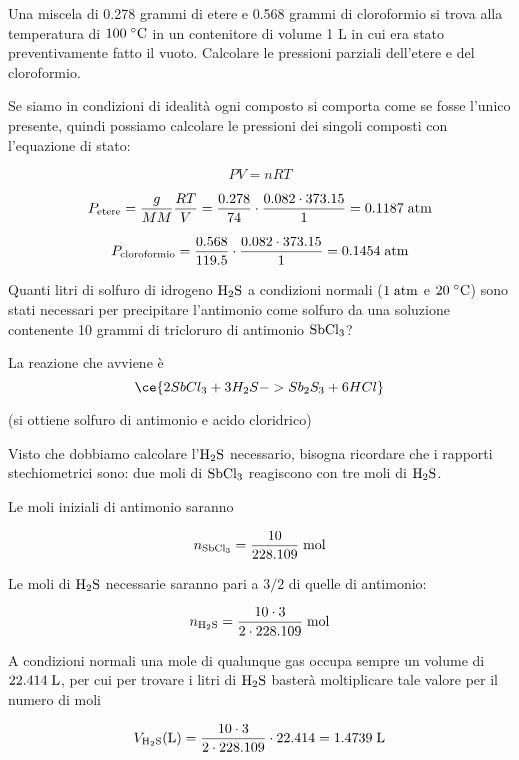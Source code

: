 \begin{esercizio}[$\bigstar$]
    Una miscela di 0.278 grammi di etere e 0.568 grammi di cloroformio si trova alla temperatura di $100 \; \rm ^{\circ}C$ in un contenitore di volume 1 L in cui era stato preventivamente fatto il vuoto. Calcolare le pressioni parziali dell'etere e del cloroformio.
\end{esercizio}
\begin{soluzione}
    Se siamo in condizioni di idealità ogni composto si comporta come se fosse l'unico presente, quindi possiamo calcolare le pressioni dei singoli composti con l'equazione di stato:

$$PV=nRT$$

$$P_{\rm etere}
=\frac{g}{MM}\frac{RT}{V}
=\frac{0.278}{74}\cdot\frac{0.082 \cdot 373.15}{1}
=0.1187 \; \rm atm$$

$$P_{\rm cloroformio}
=\frac{0.568}{119.5}\cdot\frac{0.082 \cdot 373.15}{1}
=0.1454 \; \rm atm$$

\end{soluzione}

\newpage

\begin{esercizio}[$\bigstar$]
    Quanti litri di solfuro di idrogeno $\rm H_2S$ a condizioni normali ($1 \; \rm atm$ e $20 \; ^{\circ}\rm C$) sono stati necessari per precipitare l'antimonio come solfuro da una soluzione contenente 10 grammi di tricloruro di antimonio $\rm SbCl_3$?
\end{esercizio}
\begin{soluzione}
    La reazione che avviene è
    \begin{equation*}
        \ce{2SbCl_3 + 3H_2S -> Sb_2S_3 + 6HCl}
    \end{equation*}

(si ottiene solfuro di antimonio e acido cloridrico)

Visto che dobbiamo calcolare l'$\rm H_2S$ necessario, bisogna ricordare che i rapporti stechiometrici sono: due moli di $\rm SbCl_3$ reagiscono con tre moli di $\rm H_2S$.

Le moli iniziali di antimonio saranno

$$n_{\rm SbCl_3}=\frac{10}{228.109} \; \rm mol$$

Le moli di $\rm H_2S$ necessarie saranno pari a $3/2$ di quelle di antimonio:

$$n_{\rm H_2S}=\frac{10 \cdot 3}{2 \cdot 228.109} \; \rm mol$$

A condizioni normali una mole di qualunque gas occupa sempre un volume di $22.414 \; \rm L$, per cui per trovare i litri di $\rm H_2S$ basterà moltiplicare tale valore per il numero di moli

$$V_{\rm H_2S}(\text{L})
=\frac{10 \cdot 3}{2 \cdot 228.109} \cdot 22.414
=1.4739 \; \rm L$$

\end{soluzione}

